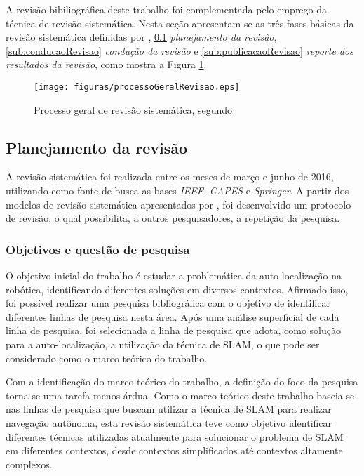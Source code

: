 
	A revisão bibiliográfica deste trabalho foi complementada pelo emprego da técnica de revisão sistemática. Nesta seção apresentam-se as três fases básicas da revisão sistemática definidas por \cite{Kitchenham}, \ref{sub:planejamentoRevisao} \textit{planejamento da revisão}, \ref{sub:conducaoRevisao} \textit{condução da revisão} e \ref{sub:publicacaoRevisao} \textit{reporte dos resultados da revisão}, como mostra a Figura \ref{img:processoGeralRevisao}.

	\begin{figure}[H]
			\centering
			\texttt{[image: figuras/processoGeralRevisao.eps]}
			\caption[Processo geral de revisão sistemática]{Processo geral de revisão sistemática, segundo \cite{Kitchenham}}
			\label{img:processoGeralRevisao}
		\end{figure}

	\subsection{Planejamento da revisão} %
	\label{sub:planejamentoRevisao}

		A revisão sistemática foi realizada entre os meses de março e junho de 2016, utilizando como fonte de busca as bases \textit{IEEE}, \textit{CAPES} e \textit{Springer}. A partir dos modelos de revisão sistemática apresentados por \cite{Kitchenham}, foi desenvolvido um protocolo de revisão, o qual possibilita, a outros pesquisadores, a repetição da pesquisa.

		\subsubsection{Objetivos e questão de pesquisa}

		O objetivo inicial do trabalho é estudar a problemática da auto-localização na robótica, identificando diferentes soluções em diversos contextos. Afirmado isso, foi possível realizar uma pesquisa bibliográfica com o objetivo de identificar diferentes linhas de pesquisa nesta área. Após uma análise superficial de cada linha de pesquisa, foi selecionada a linha de pesquisa que adota, como solução para a auto-localização, a utilização da técnica de SLAM, o que pode ser considerado como o marco teórico do trabalho.

		Com a identificação do marco teórico do trabalho, a definição do foco da pesquisa torna-se uma tarefa menos árdua. Como o marco teórico deste trabalho baseia-se nas linhas de pesquisa que buscam utilizar a técnica de SLAM para realizar navegação autônoma, esta revisão sistemática teve como objetivo identificar diferentes técnicas utilizadas atualmente para solucionar o problema de SLAM em diferentes contextos, desde contextos simplificados até contextos altamente complexos.

